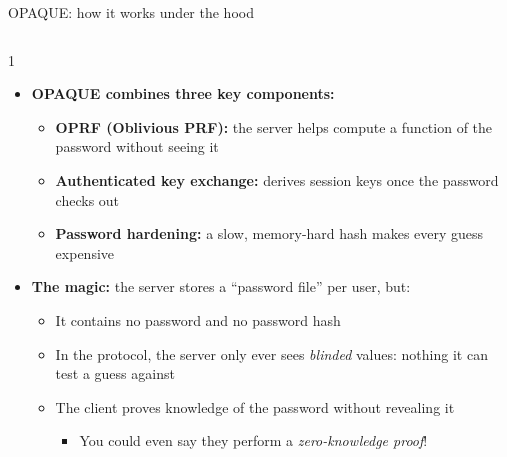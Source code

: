 \ifdefined\PRESENTATION\else\PassOptionsToClass{handout}{beamer}\fi\documentclass[aspectratio=169, lualatex]{beamer}
\begin{document}
\begin{frame}{OPAQUE: how it works under the hood}
	\begin{columns}[c]
		\begin{column}{1\textwidth}
			\begin{itemize}
				\item \textbf{OPAQUE combines three key components:}
				      \begin{itemize}
					      \item \textbf{OPRF (Oblivious PRF):} the server helps compute a function of the password without seeing it
					      \item \textbf{Authenticated key exchange:} derives session keys once the password checks out
					      \item \textbf{Password hardening:} a slow, memory-hard hash makes every guess expensive
				      \end{itemize}
				\item \textbf{The magic:} the server stores a ``password file'' per user, but:
				      \begin{itemize}
					      \item It contains no password and no password hash
					      \item In the protocol, the server only ever sees \textit{blinded} values: nothing it can test a guess against
					      \item The client proves knowledge of the password without revealing it
					            \begin{itemize}
						            \item You could even say they perform a \textit{zero-knowledge proof}!
					            \end{itemize}
				      \end{itemize}
			\end{itemize}
		\end{column}
	\end{columns}
\end{frame}
\end{document}

